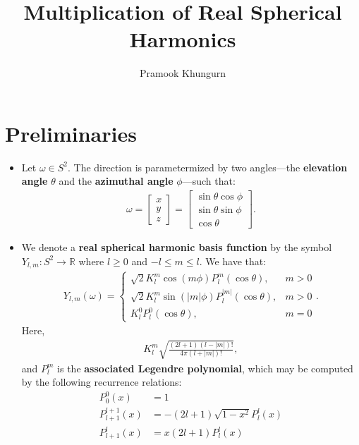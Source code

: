 \documentclass[10pt]{article}
\title{Multiplication of Real Spherical Harmonics}
\author{Pramook Khungurn}
\newcommand{\ra}{\rightarrow}
\newcommand{\Real}{\mathbb{R}}
\begin{document}
	\maketitle

	\section{Preliminaries}

	\begin{itemize}
		\item Let $\omega \in S^2$.  The direction is parametermized by two angles---the \textbf{elevation angle} $\theta$ and the \textbf{azimuthal angle} $\phi$---such that:
        \begin{align*}
            \omega
            = \begin{bmatrix}
                x \\ y \\ z
            \end{bmatrix}
            = \begin{bmatrix}
                \sin\theta \cos\phi \\
                \sin\theta \sin\phi \\
                \cos\theta
            \end{bmatrix}.
        \end{align*}

        \item We denote a \textbf{real spherical harmonic basis function} by the symbol $Y_{l,m}: S^2 \ra \Real$ where $l \geq 0$ and $-l \leq m \leq l$.  We have that:
        \begin{align*}
            Y_{l,m}(\omega)
            = \begin{cases}
                \sqrt{2} K_l^m \cos (m\phi) P_l^m (\cos\theta), & m > 0 \\
                \sqrt{2} K_l^m \sin (|m|\phi) P_l^{|m|} (\cos\theta), & m > 0 \\
                K_l^0 P_l^0 (\cos\theta), & m = 0
            \end{cases}.
        \end{align*}
        Here,
        \begin{align*}
            K_l^m \sqrt{\frac{(2l+1)(l-|m|)!}{4\pi(l+|m|)!}},
        \end{align*}
        and $P_l^m$ is the \textbf{associated Legendre polynomial}, which may be computed by the following recurrence relations:
        \begin{align*}            
            P_0^0(x) &= 1 \\
            P^{l+1}_{l+1}(x) &= -(2l+1) \sqrt{1 - x^2} P^l_l(x) \\
            P^l_{l+1}(x) &= x(2l+1)P^l_l(x)
        \end{align*}


\end{itemize}
\end{document}
